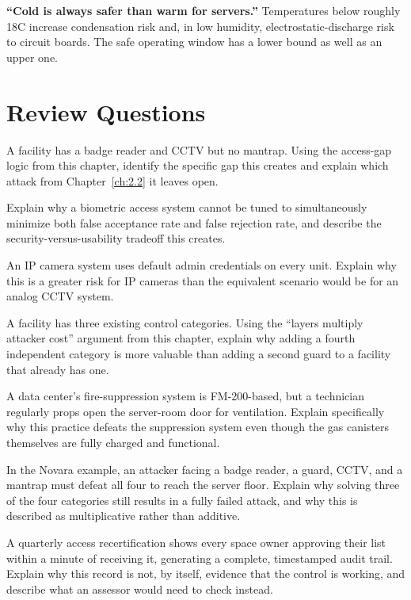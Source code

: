 \begin{misconception}
\textbf{``Cold is always safer than warm for servers.''} Temperatures below roughly 18\textdegree{}C
increase condensation risk and, in low humidity, electrostatic-discharge risk to circuit boards.
The safe operating window has a lower bound as well as an upper one.
\end{misconception}

\section*{Review Questions}
\begin{reviewquestions}
\item A facility has a badge reader and CCTV but no mantrap. Using the access-gap logic from this
chapter, identify the specific gap this creates and explain which attack from Chapter~\ref{ch:2.2}
it leaves open.
\item Explain why a biometric access system cannot be tuned to simultaneously minimize both false
acceptance rate and false rejection rate, and describe the security-versus-usability tradeoff this
creates.
\item An IP camera system uses default admin credentials on every unit. Explain why this is a
greater risk for IP cameras than the equivalent scenario would be for an analog CCTV system.
\item A facility has three existing control categories. Using the ``layers multiply attacker
cost'' argument from this chapter, explain why adding a fourth independent category is more
valuable than adding a second guard to a facility that already has one.
\item A data center's fire-suppression system is FM-200-based, but a technician regularly props
open the server-room door for ventilation. Explain specifically why this practice defeats the
suppression system even though the gas canisters themselves are fully charged and functional.
\item In the Novara example, an attacker facing a badge reader, a guard, CCTV, and a mantrap must
defeat all four to reach the server floor. Explain why solving three of the four categories still
results in a fully failed attack, and why this is described as multiplicative rather than
additive.
\item A quarterly access recertification shows every space owner approving their list within a
minute of receiving it, generating a complete, timestamped audit trail. Explain why this record
is not, by itself, evidence that the control is working, and describe what an assessor would need
to check instead.
\end{reviewquestions}


